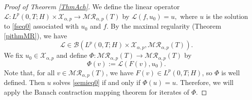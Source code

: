 \documentclass[reqno]{amsart}
\numberwithin{equation}{section}
\begin{document}
\begin{proof}[Proof of Theorem \ref{ThmAch}]
We define the linear operator $\mathcal{L}: L^p(0,T;H)\times\mathcal{X}_{\alpha,p}\to \mathcal{M}\mathcal{R}_{\alpha,p}(T)$ by  $\mathcal{L}(f,u_0)=u,$ where $u$ is the solution to \eqref{fseq0} associated with $u_0$ and $f$. By the maximal regularity (Theorem \ref{pithmMR}), we have $$\mathcal{L}\in \mathcal{B}\left(L^p(0,T;H)\times \mathcal{X}_{\alpha,p}, \mathcal{M}\mathcal{R}_{\alpha,p}(T)\right).$$ 
We fix $u_0\in \mathcal{X}_{\alpha,p}$ and define $\Phi:\mathcal{M}\mathcal{R}_{\alpha,p}(T)\to \mathcal{M}\mathcal{R}_{\alpha,p}(T)$ by
$$\Phi(v):=\mathcal{L}(F(v),u_0).$$
Note that, for all $v\in \mathcal{M}\mathcal{R}_{\alpha,p}(T)$, we have $F(v)\in L^p(0,T;H)$, so $\Phi$ is well defined. Then $u$ solves \eqref{semieq0} if and only if $\Phi(u)=u$. Therefore, we will apply the Banach contraction mapping theorem for iterates of $\Phi$.


\end{proof}
\end{document}
